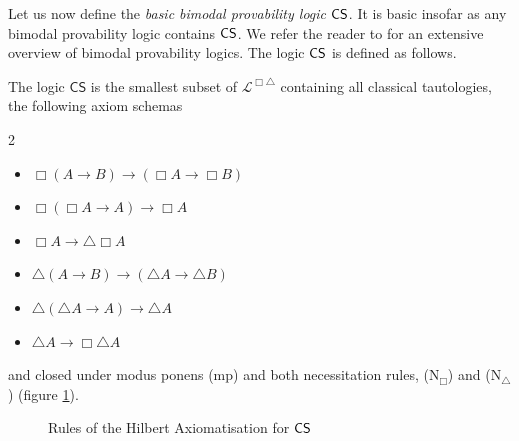 \documentclass[runningheads,orivec]{llncs}
\newcommand{\CS}{\textnormal{\textsf{CS}}}
\newcommand{\La}{\mathcal{L}}
\newcommand{\LaBi}{\La^{\Box \triangle}}
\begin{document}
Let us now define the \emph{basic bimodal provability logic} $\CS$. It is basic insofar as any bimodal provability logic contains $\CS$.
We refer the reader to \cite[Chapter 8]{Artemov2005} for an extensive overview of bimodal provability logics.
The logic $\CS$ is defined as follows.

\begin{definition} \label{def:CS}
    The logic $\mathsf{CS}$ is the smallest subset of $\LaBi$ containing all classical tautologies, the following axiom schemas \vspace{-1em}
    \begin{multicols}{2} 
   \begin{itemize} \setlength{\itemindent}{2em}
    \item[$(\textnormal{K}_\Box)$]
            $\Box (A \to B) \to (\Box A \to \Box B)$
    \item[$(\textnormal{L}_\Box)$] 
          $\Box (\Box A \to A ) \to \Box A$
    \item[$(\textnormal{4}_{\triangle\Box})$]
          $\Box A \to \triangle \Box A$ 
    \item[$(\textnormal{K}_\triangle)$] 
           $\triangle (A \to B) \to (\triangle A \to \triangle B)$
    \item[$(\textnormal{L}_\triangle)$] 
            $\triangle (\triangle A \to A ) \to \triangle A$ 
    \item[$(\textnormal{4}_{\Box\triangle})$]
        $\triangle A \to \Box \triangle A$ 
   \end{itemize}
  \end{multicols} \vspace{-1em}  
  \noindent
  and closed under modus ponens (mp) and both necessitation rules, (N$_\Box$) and (N$_\triangle$) (figure \ref{fig:HilbertRules}).
\end{definition}

\begin{figure}[t!]
\begin{mdframed}
    \centering 
    \begin{prooftree}
    \end{prooftree} \hspace{23mm}
    \begin{prooftree}
    \end{prooftree}  \hspace{23mm}
    \begin{prooftree}
    \end{prooftree} 
\end{mdframed}
    \caption{Rules of the Hilbert Axiomatisation for $\CS$}
    \label{fig:HilbertRules}
\end{figure}
\end{document}
